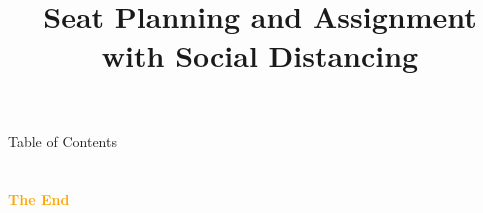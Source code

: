 \documentclass[aspectratio=43]{beamer}
\title{Seat Planning and Assignment with Social Distancing} %
\subtitle{}
\institute[HKUST]{
    IEDA%
    \\%
    The Hong Kong University of Science and Technology%
} %
\date{}
\begin{document}
    \frame{\titlepage}
    \begin{frame}{Table of Contents}
        \tableofcontents
    \end{frame}
    
    
    
    
    
    
    
    
    

    \section{}
    \begin{frame}{}
        \centering
            \Huge\bfseries
        \textcolor{orange}{The End}
    \end{frame}
\end{document}
